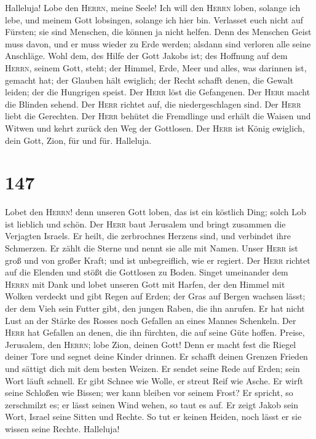  Halleluja! Lobe den \textsc{Herrn}, meine Seele!
 Ich will den \textsc{Herrn} loben, solange ich lebe, und
meinem Gott lobsingen, solange ich hier bin.  Verlasset
euch nicht auf Fürsten; sie sind Menschen, die können ja nicht helfen.
 Denn des Menschen Geist muss davon, und er muss wieder zu
Erde werden; alsdann sind verloren alle seine Anschläge. 
Wohl dem, des Hilfe der Gott Jakobs ist; des Hoffnung auf dem
\textsc{Herrn}, seinem Gott, steht;  der Himmel, Erde,
Meer und alles, was darinnen ist, gemacht hat; der Glauben hält
ewiglich;  der Recht schafft denen, die Gewalt leiden; der
die Hungrigen speist. Der \textsc{Herr} löst die Gefangenen.
 Der \textsc{Herr} macht die Blinden sehend. Der
\textsc{Herr} richtet auf, die niedergeschlagen sind. Der \textsc{Herr}
liebt die Gerechten.  Der \textsc{Herr} behütet die
Fremdlinge und erhält die Waisen und Witwen und kehrt zurück den Weg der
Gottlosen.  Der \textsc{Herr} ist König ewiglich, dein
Gott, Zion, für und für. Halleluja.

\hypertarget{section-146}{%
\section{147}\label{section-146}}

 Lobet den \textsc{Herrn}! denn unseren Gott loben, das
ist ein köstlich Ding; solch Lob ist lieblich und schön. 
Der \textsc{Herr} baut Jerusalem und bringt zusammen die Verjagten
Israels.  Er heilt, die zerbrochnes Herzens sind, und
verbindet ihre Schmerzen.  Er zählt die Sterne und nennt
sie alle mit Namen.  Unser \textsc{Herr} ist groß und von
großer Kraft; und ist unbegreiflich, wie er regiert.  Der
\textsc{Herr} richtet auf die Elenden und stößt die Gottlosen zu Boden.
 Singet umeinander dem \textsc{Herrn} mit Dank und lobet
unseren Gott mit Harfen,  der den Himmel mit Wolken
verdeckt und gibt Regen auf Erden; der Gras auf Bergen wachsen lässt;
 der dem Vieh sein Futter gibt, den jungen Raben, die ihn
anrufen.  Er hat nicht Lust an der Stärke des Rosses noch
Gefallen an eines Mannes Schenkeln.  Der \textsc{Herr}
hat Gefallen an denen, die ihn fürchten, die auf seine Güte hoffen.
 Preise, Jerusalem, den \textsc{Herrn}; lobe Zion, deinen
Gott!  Denn er macht fest die Riegel deiner Tore und
segnet deine Kinder drinnen.  Er schafft deinen Grenzen
Frieden und sättigt dich mit dem besten Weizen.  Er
sendet seine Rede auf Erden; sein Wort läuft schnell.  Er
gibt Schnee wie Wolle, er streut Reif wie Asche.  Er
wirft seine Schloßen wie Bissen; wer kann bleiben vor seinem Frost?
 Er spricht, so zerschmilzt es; er lässt seinen Wind
wehen, so taut es auf.  Er zeigt Jakob sein Wort, Israel
seine Sitten und Rechte.  So tut er keinen Heiden, noch
lässt er sie wissen seine Rechte. Halleluja!

